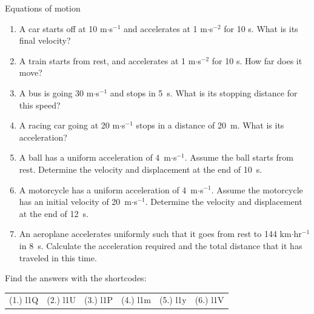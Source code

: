 \begin{exercises}{Equations of motion}
            \nopagebreak \noindent
          \label{m38796*id79517}\begin{enumerate}[noitemsep, label=\textbf{\arabic*}. ] 
            \label{m38796*uid144}\item A car starts off at 10 m$\ensuremath{\cdot}$s${}^{-1}$ and accelerates at 1 m$\ensuremath{\cdot}$s${}^{-2}$ for 10 s. What is its final velocity?\newline
\label{m38796*uid145}\item A train starts from rest, and accelerates at 1 m$\ensuremath{\cdot}$s${}^{-2}$ for 10 s. How far does it move?\newline
\label{m38796*uid146}\item A bus is going 30 m$\ensuremath{\cdot}$s${}^{-1}$ and stops in 5~s. What is its stopping distance for this speed?\newline
\label{m38796*uid147}\item A racing car going at 20 m$\ensuremath{\cdot}$s${}^{-1}$ stops in a distance of 20~m. What is its acceleration?\newline
\label{m38796*uid148}\item A ball has a uniform acceleration of 4~m$\ensuremath{\cdot}$s${}^{-1}$. Assume the ball starts from rest. Determine the velocity and displacement at the end of 10~s.\newline
\label{m38796*uid149}\item A motorcycle has a uniform acceleration of 4~m$\ensuremath{\cdot}$s${}^{-1}$. Assume the motorcycle has an initial velocity of 20~m$\ensuremath{\cdot}$s${}^{-1}$. Determine the velocity and displacement at the end of 12~s.\newline
\label{m38796*uid150}\item An aeroplane accelerates uniformly such that it goes from rest to 144 km$\ensuremath{\cdot}$hr${}^{-1}$in 8~s. Calculate the acceleration required and the total distance that it has traveled in this time.\newline
\end{enumerate}
    \label{m38796*cid11}
\par {} Find the answers with the shortcodes:
 \par \begin{tabular}[h]{cccccc}
 (1.) l1Q  &  (2.) l1U  &  (3.) l1P  &  (4.) l1m  &  (5.) l1y  &  (6.) l1V  & \end{tabular}
\end{exercises}

